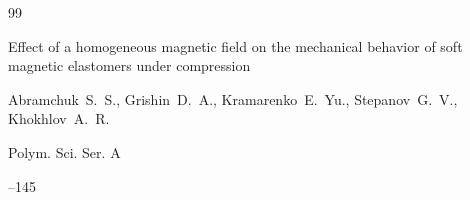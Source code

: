 \begin{thebibliography}{99}

\paper  Effect of a homogeneous magnetic field on the mechanical behavior of soft magnetic elastomers under compression

\by Abramchuk~S.~S., Grishin~D.~A., Kramarenko~E.~Yu., Stepanov~G.~V., Khokhlov~A.~R.

\jour Polym. Sci. Ser. A




--145




\end{thebibliography}



\newpage



%

%


